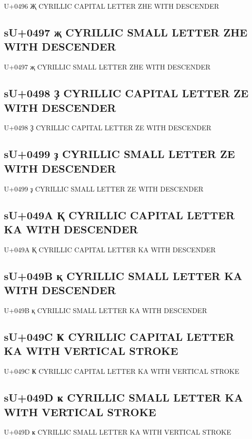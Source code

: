 U+0496 Җ  CYRILLIC CAPITAL LETTER ZHE WITH DESCENDER

\subsection{sU+0497 җ  CYRILLIC SMALL LETTER ZHE WITH DESCENDER}

U+0497 җ  CYRILLIC SMALL LETTER ZHE WITH DESCENDER

\subsection{sU+0498 Ҙ  CYRILLIC CAPITAL LETTER ZE WITH DESCENDER}

U+0498 Ҙ  CYRILLIC CAPITAL LETTER ZE WITH DESCENDER

\subsection{sU+0499 ҙ  CYRILLIC SMALL LETTER ZE WITH DESCENDER}

U+0499 ҙ  CYRILLIC SMALL LETTER ZE WITH DESCENDER

\subsection{sU+049A Қ  CYRILLIC CAPITAL LETTER KA WITH DESCENDER}

U+049A Қ  CYRILLIC CAPITAL LETTER KA WITH DESCENDER

\subsection{sU+049B қ  CYRILLIC SMALL LETTER KA WITH DESCENDER}

U+049B қ  CYRILLIC SMALL LETTER KA WITH DESCENDER

\subsection{sU+049C Ҝ  CYRILLIC CAPITAL LETTER KA WITH VERTICAL STROKE}

U+049C Ҝ  CYRILLIC CAPITAL LETTER KA WITH VERTICAL STROKE

\subsection{sU+049D ҝ  CYRILLIC SMALL LETTER KA WITH VERTICAL STROKE}

U+049D ҝ  CYRILLIC SMALL LETTER KA WITH VERTICAL STROKE

